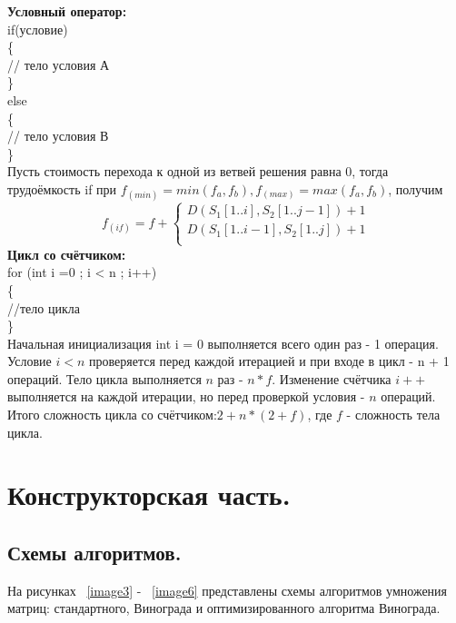 \documentclass[a4paper]{article}
\begin{document}
 \textbf{Условный оператор:}\\
		if(условие)\\
		\{\\
				// тело условия А \\
		\}\\
		else\\
		\{\\
		// тело условия В\\
		\}\\
	
 	Пусть стоимость перехода к одной из ветвей решения равна 0, тогда трудоёмкость if при $f_(min) = min (f_a, f_b), f_(max) = max(f_a, f_b)$, получим
 	\begin{equation}
 		f_(if) = f + \begin{cases}
 			D(S_1[1..i], S_2[1..j-1]) + 1\\
 			D(S_1[1..i-1], S_2[1..j]) + 1\\
 			\end{cases}
 		\label{formula_4}
 	\end{equation}	
 \textbf{Цикл со счётчиком:}\\
 for (int i =0 ; i < n ; i++)\\
 \{\\
 	//тело цикла\\
 \}\\
 
 Начальная инициализация  int i = 0 выполняется всего один раз - 1 операция. Условие $i < n$ проверяется перед каждой итерацией и при входе в цикл - n + 1 операций. Тело цикла выполняется $n$ раз - $ n * f$. Изменение счётчика $i++$ выполняется на каждой итерации, но перед проверкой условия - $n$ операций. Итого сложность цикла со счётчиком:$2+ n * (2+f)$, где $f$ - сложность тела цикла.
 
 
 \section {Конструкторская часть.}
 \subsection{Схемы алгоритмов.} 
 На рисунках ~\ref{image3} - ~\ref{image6} представлены схемы алгоритмов умножения матриц: стандартного, Винограда и оптимизированного алгоритма Винограда.
 
\end{document}
